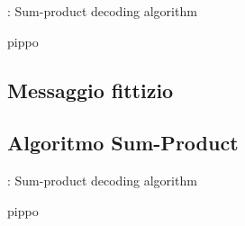 \begin{algorithm}
\caption{: Sum-product decoding algorithm}
\begin{algorithmic}
\STATE pippo
\end{algorithmic}
\end{algorithm}

\subsection{Messaggio fittizio}

\subsection{Algoritmo Sum-Product}

\begin{algorithm}
\caption{: Sum-product decoding algorithm}
\begin{algorithmic}
\STATE pippo
\end{algorithmic}
\end{algorithm}




